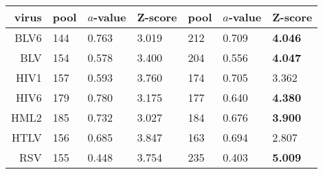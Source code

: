 \begin{table}
\begin{tabular}{r|lll|lll|}
\hline \hline
virus  & pool & $a$-value & Z-score & pool & $a$-value & Z-score \\
\hline
BLV6   &  144  & 0.763 &      3.019  &  212  & 0.709 & {\bf 4.046} \\
BLV    &  154  & 0.578 &      3.400  &  204  & 0.556 & {\bf 4.047} \\
HIV1   &  157  & 0.593 &      3.760  &  174  & 0.705 &      3.362  \\
HIV6   &  179  & 0.780 &      3.175  &  177  & 0.640 & {\bf 4.380} \\
HML2   &  185  & 0.732 &      3.027  &  184  & 0.676 & {\bf 3.900} \\
HTLV   &  156  & 0.685 &      3.847  &  163  & 0.694 &      2.807  \\
RSV    &  155  & 0.448 &      3.754  &  235  & 0.403 & {\bf 5.009} \\
\hline \hline

\end{tabular}
\end{table}
